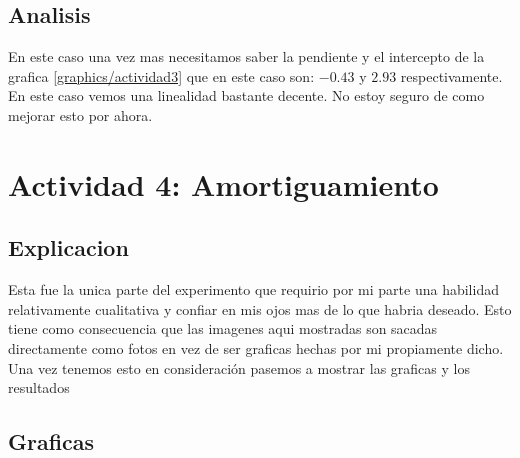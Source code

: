 \documentclass{report}
\begin{document}
\section{Analisis}

En este caso una vez mas necesitamos saber la pendiente y el intercepto de la grafica \ref{graphics/actividad3} que en este caso son: $-0.43$ y $2.93$ respectivamente. En este caso vemos una linealidad bastante decente. No estoy seguro de como mejorar esto por ahora.

\chapter{Actividad 4: Amortiguamiento}
\section{Explicacion}

Esta fue la unica parte del experimento que requirio por mi parte una habilidad relativamente cualitativa y confiar en mis ojos mas de lo que habria deseado. Esto tiene como consecuencia que las imagenes aqui mostradas son sacadas directamente como fotos en vez de ser graficas hechas por mi propiamente dicho. Una vez tenemos esto en consideración pasemos a mostrar las graficas y los resultados

\section{Graficas}
\end{document}
